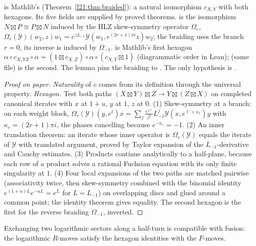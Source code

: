 \begin{dictionary}
 is Mathlib's (Theorem~\ref{l21:thm:braided}): a natural isomorphism $c_{X,Y}$ with both
hexagons. Its five fields are supplied by proved theorems.  is the isomorphism $N\boxtimes
P\cong P\boxtimes N$ induced by the HLZ skew-symmetry operator $\Omega_r$, $\Omega_r(\mathcal Y)(w_2,z)w_1=
e^{zL_{-1}}\mathcal Y(w_1,e^{(2r+1)\pi i}z)w_2$; the braiding uses the branch $r=0$, its inverse is induced by $\Omega_{-1}$.
 is Mathlib's first hexagon $\alpha\circ c_{X,YZ}\circ\alpha=(1\boxtimes c_{X,Z})\circ\alpha\circ(c_{X,Y}
\boxtimes1)$ (diagrammatic order in Lean);  (same file) is the second. The  lemma pins the
braiding to . The only hypothesis is .
\end{dictionary}

\begin{proof}[Proof on paper]
\emph{Naturality} of $c$ comes from its definition through the universal property. \emph{Hexagon.} Test both paths
$(X\boxtimes Y)\boxtimes Z\to Y\boxtimes(Z\boxtimes X)$ on completed canonical iterates with $x$ at $1+u$, $y$ at $1$, $z$ at $0$.
(1) Skew-symmetry at a branch: on each weight block, $\Omega_r(\mathcal Y)(y,e^{\ell})x=\sum_j\frac{e^{j\ell}}{j!}L_{-1}^j
\mathcal Y(x,e^{\ell+\kappa_r})y$ with $\kappa_r=(2r+1)\pi i$, the phases cancelling because $e^{-\kappa_r}=-1$. (2) An
inner translation theorem: an iterate whose inner operator is $\Omega_r(\mathcal Y)$ equals the iterate of $\mathcal Y$
with translated argument, proved by Taylor expansion of the $L_{-1}$-derivative and Cauchy estimates. (3) Products
continue analytically to a half-plane, because each row of a product solves a rational Fuchsian equation with its only
finite singularity at $1$. (4) Four local expansions of the two paths are matched pairwise (associativity twice, then
skew-symmetry combined with the binomial identity $e^{(1+u)L}e^{-uL}=e^{L}$ for $L=L_{-1}$) on overlapping discs and glued
around a common point; the identity theorem gives equality. The second hexagon is the first for the reverse braiding
$\Omega_{-1}$, inverted.
\end{proof}

\begin{physics}
Exchanging two logarithmic sectors along a half-turn is compatible with fusion: the logarithmic $R$-moves satisfy the
hexagon identities with the $F$-moves.
\end{physics}

